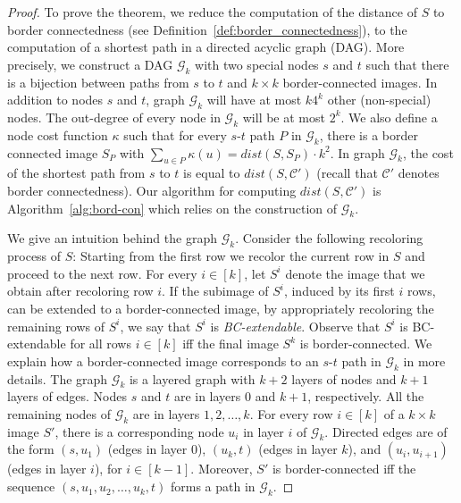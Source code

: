 \documentclass[11pt,english]{article}
\numberwithin{figure}{section}
\newcommand{\C}{{\mathcal C}}
\newcommand{\dis}{dist}
\begin{document}
\begin{proof}
\newcommand{\cG}{{\mathcal G}}
\newcommand{\col}{\chi}
\newcommand{\cc}{CC-partition}
To prove the theorem, we reduce the computation of the distance of $S$ to border connectedness (see Definition~\ref{def:border_connectedness}), to the computation of a shortest path in a directed acyclic graph (DAG). More precisely, we construct a DAG $\cG_k$ with two special nodes $s$ and $t$ such that there is a bijection between paths from $s$ to $t$ and $k\times k$ border-connected images. In addition to nodes $s$ and $t$, graph $\cG_k$ will have at most $k4^k$ other (non-special) nodes. The out-degree of every node in $\cG_k$ will be at most $2^k$. We also define a node cost function $\kappa$ such that for
every $s$-$t$ path $P$ in $\cG_k$, there is a border connected image $S_P$ with $\sum_{u\in P}\kappa(u)=\dis(S,S_P)\cdot k^2$. In graph $\cG_k$, the cost of the shortest path from $s$ to $t$ is equal to $\dis(S,\C')$ (recall that $\C'$ denotes border connectedness). Our algorithm for computing $\dis(S,\C')$ is Algorithm~\ref{alg:bord-con} which relies on the construction of $\cG_k$.

We give an intuition behind the graph $\cG_k$. Consider the following recoloring process of $S$: Starting from the first row we recolor the current row in $S$ and proceed to the next row. For every $i\in[k]$, let $S^i$ denote the image that we obtain after recoloring row $i$. If the subimage of $S^i$, induced by its first $i$ rows, can be extended to a border-connected image, by appropriately recoloring the remaining rows of $S^i$, we say that $S^i$ is {\em BC-extendable}. Observe that $S^i$ is BC-extendable for all rows $i\in[k]$ iff the final image $S^k$ is border-connected. We explain how a border-connected image corresponds to an $s$-$t$ path in $\cG_k$ in more details. The graph $\cG_k$ is a layered graph with $k+2$ layers of nodes and $k+1$ layers of edges. Nodes $s$ and $t$ are in layers $0$ and $k+1$, respectively. All the remaining nodes of $\cG_k$ are in layers $1,2,\ldots,k$. For every row $i\in[k]$ of a $k\times k$ image $S'$, there is a corresponding node $u_i$ in layer $i$ of $\cG_k$. Directed edges are of the form $(s,u_1)$ (edges in layer 0), $(u_k,t)$ (edges in layer $k$), and $(u_i,u_{i+1})$ (edges in layer $i$), for $i\in[k-1]$. Moreover, $S'$ is border-connected iff the sequence $(s,u_1,u_2,\ldots,u_k,t)$ forms a path in $\cG_k$.


\end{proof}
\end{document}
